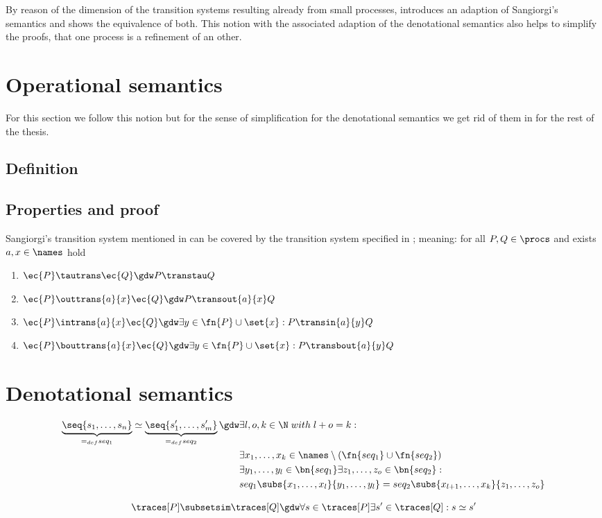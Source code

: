 By reason of the dimension of the transition systems resulting already from small processes,  introduces an adaption of Sangiorgi's semantics and shows the equivalence of both. This notion with the associated adaption of the denotational semantics also helps to simplify the proofs, that one process is a refinement of an other.
\section{Operational semantics}
\label{sec_op_sem_coverage}
For this section we follow this notion but for the sense of simplification for the denotational semantics we get rid of them in  for the rest of the thesis.
\subsection{Definition}
\label{sec_op_sem_cov_def}


\subsection{Properties and proof}
\label{sec_op_sem_cov_prop}
\begin{theorem}[Coverability]
	Sangiorgi's transition system mentioned in  can be covered by the transition system specified in ; meaning:
	for all $P,Q\in\procs$ and exists $a,x\in\names$ hold
	\begin{enumerate}
		\item $\ec{P}\tautrans\ec{Q} \gdw P\transtau Q$
		\item $\ec{P}\outtrans{a}{x}\ec{Q} \gdw P\transout{a}{x} Q$
		\item $\ec{P}\intrans{a}{x}\ec{Q} \gdw \exists y\in\fn{P}\cup\set{x}: P\transin{a}{y} Q$
		\item $\ec{P}\bouttrans{a}{x}\ec{Q} \gdw \exists y\in\fn{P}\cup\set{x}: P\transbout{a}{y} Q$
	\end{enumerate}
\end{theorem}

\section{Denotational semantics}
\label{sec_op_sem_coverage}

\begin{align*}
\underbrace{\seq{s_1,\dots,s_n}}_{=_{def}seq_1} \simeq \underbrace{\seq{s_1',\dots,s_m'}}_{=_{def} seq_2} \gdw & \exists l,o,k\in\N\; with\; l+o=k: \\
& \exists x_1,\dots,x_k\in\names\setminus\left(\fn{seq_1}\cup\fn{seq_2}\right) \\
& \exists y_1,\dots,y_l\in\bn{seq_1} \exists z_1,\dots,z_o\in\bn{seq_2}: \\
& seq_1\subs{x_1,\dots,x_l}{y_1,\dots,y_l} = seq_2\subs{x_{l+1},\dots,x_k}{z_1,\dots,z_o}
\end{align*}

\[\traces[P] \subsetsim \traces[Q] \gdw \forall s\in\traces[P]\exists s'\in\traces[Q]: s\simeq s' \]
